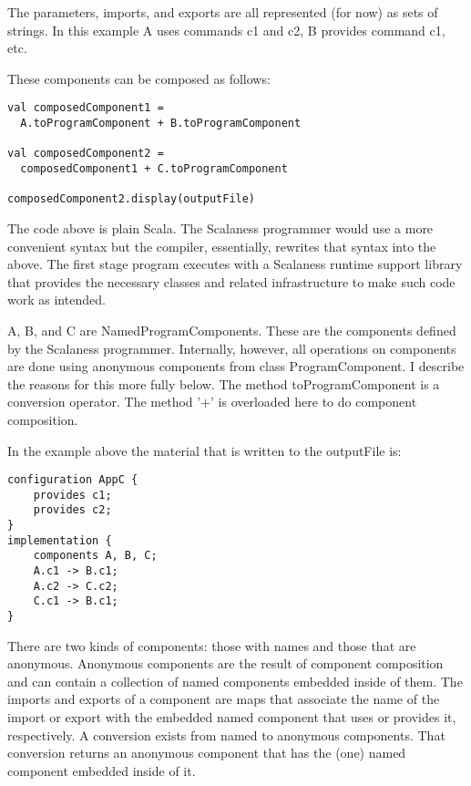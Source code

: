 The parameters, imports, and exports are all represented (for now) as sets of strings. In this
example A uses commands c1 and c2, B provides command c1, etc.

These components can be composed as follows:

\singlespace
\begin{lstlisting}[language=scalaness]
val composedComponent1 =
  A.toProgramComponent + B.toProgramComponent

val composedComponent2 =
  composedComponent1 + C.toProgramComponent

composedComponent2.display(outputFile)
\end{lstlisting}
\primaryspacing

The code above is plain Scala. The Scalaness programmer would use a more convenient syntax but
the compiler, essentially, rewrites that syntax into the above. The first stage program executes
with a Scalaness runtime support library that provides the necessary classes and related
infrastructure to make such code work as intended.

A, B, and C are NamedProgramComponents. These are the components defined by the Scalaness
programmer. Internally, however, all operations on components are done using anonymous
components from class ProgramComponent. I describe the reasons for this more fully below. The
method toProgramComponent is a conversion operator. The method '+' is overloaded here to do
component composition.

In the example above the material that is written to the outputFile is:

\singlespace
\begin{lstlisting}[language=nesC]
configuration AppC {
    provides c1;
    provides c2;
}
implementation {
    components A, B, C;
    A.c1 -> B.c1;
    A.c2 -> C.c2;
    C.c1 -> B.c1;
}
\end{lstlisting}
\primaryspacing

There are two kinds of components: those with names and those that are anonymous. Anonymous
components are the result of component composition and can contain a collection of named
components embedded inside of them. The imports and exports of a component are maps that
associate the name of the import or export with the embedded named component that uses or
provides it, respectively. A conversion exists from named to anonymous components. That
conversion returns an anonymous component that has the (one) named component embedded inside of
it.

